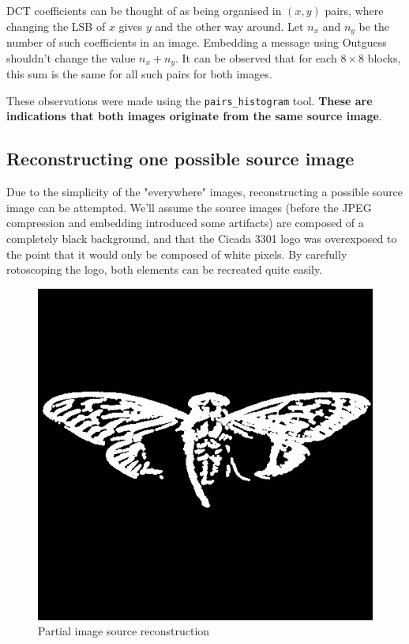 \documentclass{article}
\begin{document}
DCT coefficients can be thought of as being organised in $(x, y)$ pairs, where changing the LSB of $x$ gives $y$ and the other way around. Let $n_x$ and $n_y$ be the number of such coefficients in an image. Embedding a message using Outguess shouldn't change the value $n_x + n_y$. It can be observed that for each $8 \times 8$ blocks, this sum is the same for all such pairs for both images.

These observations were made using the \texttt{pairs\_histogram} tool. \textbf{These are indications that both images originate from the same source image}. \\

\subsection{Reconstructing one possible source image}

Due to the simplicity of the "everywhere" images, reconstructing a possible source image can be attempted. We'll assume the source images (before the JPEG compression and embedding introduced some artifacts) are composed of a completely black background, and that the Cicada 3301 logo was overexposed to the point that it would only be composed of white pixels. By carefully rotoscoping the logo, both elements can be recreated quite easily.

\begin{figure}[h]
	\centering
	
	\includegraphics{partial_reconstruction}
	
	\caption{Partial image source reconstruction}
\end{figure}
\FloatBarrier
\end{document}
